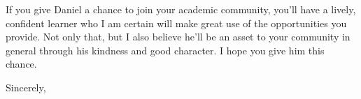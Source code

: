 \documentclass[11pt, letterpaper]{letter} %
\begin{document}
\begin{letter}
If you give Daniel a chance to join your academic community, you'll have a lively, confident learner who I am certain will make great use of the opportunities you provide. Not only that, but I also believe he'll be an asset to your community in general through his kindness and good character. I hope you give him this chance.

\closing{Sincerely,}




\end{letter}
\end{document}
